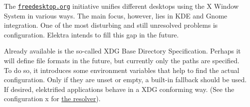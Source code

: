 The \href{https://freedesktop.org}{\tt freedesktop.\+org} initiative unifies different desktops using the X Window System in various ways. The main focus, however, lies in K\+DE and Gnome integration. One of the most disturbing and still unresolved problems is configuration. Elektra intends to fill this gap in the future.

Already available is the so-\/called X\+DG Base Directory Specification. Perhaps it will define file formats in the future, but currently only the paths are specified. To do so, it introduces some environment variables that help to find the actual configuration. Only if they are unset or empty, a built-\/in fallback should be used. If desired, elektrified applications behave in a X\+DG conforming way. (See the configuration x for \hyperlink{autotoc_md579_src_plugins_resolver_README_md}{the resolver}). 